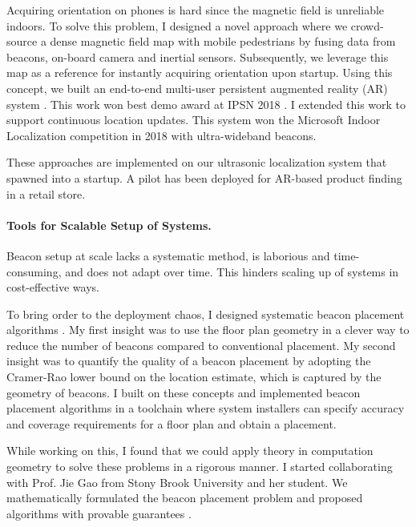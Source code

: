 \documentclass[10pt]{article}
\begin{document}
Acquiring orientation on phones is hard since the magnetic field is unreliable indoors. To solve this problem, 
I designed a novel approach %
where we %
crowd-source a dense magnetic field map with mobile pedestrians by fusing data from beacons, on-board camera and inertial sensors. 
Subsequently, we leverage this map as a reference for instantly acquiring orientation upon startup. %
Using this concept, we built an end-to-end multi-user persistent augmented reality (AR) system \cite{mobileAR}. This work won best demo award at IPSN 2018 \cite{rajagopal2018welcome}. I extended this work to support continuous location updates. This system won the Microsoft Indoor Localization competition in 2018 with ultra-wideband beacons. 

These approaches are implemented on our ultrasonic localization system that spawned into a startup. A pilot has been deployed for AR-based product finding in a retail store. 

\paragraph{Tools for Scalable Setup of Systems.  }
Beacon setup at scale lacks a systematic method, is laborious and time-consuming, and does not adapt over time. This hinders scaling up of systems in cost-effective ways. %

To bring order to the deployment chaos, I designed systematic beacon placement algorithms \cite{rajagopal2016beacon}. 
My first insight was to use the floor plan geometry in a clever way to reduce the number of beacons compared to conventional placement. 
My second insight was to quantify the quality of a beacon placement by adopting the Cramer-Rao lower bound on the location estimate, which is captured by the geometry of beacons. I built on these concepts and implemented beacon placement algorithms in a toolchain where system installers can specify accuracy and coverage requirements for a floor plan and obtain a placement. 

While working on this, I found that we could apply theory in computation geometry to solve these problems in a rigorous manner.  
I started collaborating with Prof. Jie Gao from Stony Brook University and her student. 
We mathematically formulated the beacon placement problem and proposed algorithms with provable guarantees \cite{beaconplacementtheory}.  
\end{document}
